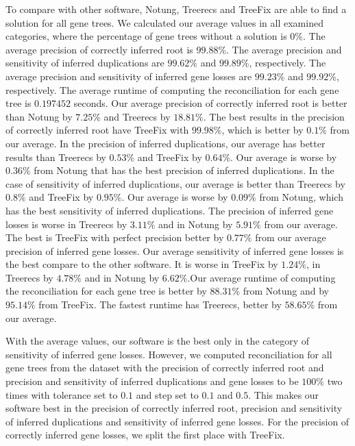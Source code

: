 To compare with other software, Notung, Treerecs and TreeFix are able to find a solution for all gene trees. We calculated our average values in all examined categories, where the percentage of gene trees without a solution is $0\%$. The average precision of correctly inferred root is $99.88\%$. The average precision and sensitivity of inferred duplications are $99.62\%$ and $99.89\%$, respectively. The average precision and sensitivity of inferred gene losses are $99.23\%$ and $99.92\%$, respectively. The average runtime of computing the reconciliation for each gene tree is $0.197452$ seconds.
Our average precision of correctly inferred root is better than Notung by $7.25\%$ and Treerecs by $18.81\%$. The best results in the precision of correctly inferred root have TreeFix with $99.98\%$, which is better by $0.1\%$ from our average. In the precision of inferred duplications, our average has better results than Treerecs by $0.53\%$ and TreeFix by $0.64\%$. Our average is worse by $0.36\%$ from Notung that has the best precision of inferred duplications. In the case of sensitivity of inferred duplications, our average is better than Treerecs by $0.8\%$ and TreeFix by $0.95\%$. Our average is worse by $0.09\%$ from Notung, which has the best sensitivity of inferred duplications. The precision of inferred gene losses is worse in Treerecs by $3.11\%$ and in Notung by $5.91\%$ from our average. The best is TreeFix with perfect precision better by $0.77\%$ from our average precision of inferred gene losses. Our average sensitivity of inferred gene losses is the best compare to the other software. It is worse in TreeFix by $1.24\%$, in Treerecs by $4.78\%$ and in Notung by $6.62\%$.Our average runtime of computing the reconciliation for each gene tree is better by $88.31\%$ from Notung and by $95.14\%$ from TreeFix. The fastest runtime has Treerecs, better by $58.65\%$ from our average.

With the average values, our software is the best only in the category of sensitivity of inferred gene losses. However, we computed reconciliation for all gene trees from the dataset with the precision of correctly inferred root and precision and sensitivity of inferred duplications and gene losses to be $100\%$ two times with tolerance set to $0.1$ and step set to $0.1$ and $0.5$. This makes our software best in the precision of correctly inferred root, precision and sensitivity of inferred duplications and sensitivity of inferred gene losses. For the precision of correctly inferred gene losses, we split the first place with TreeFix.

